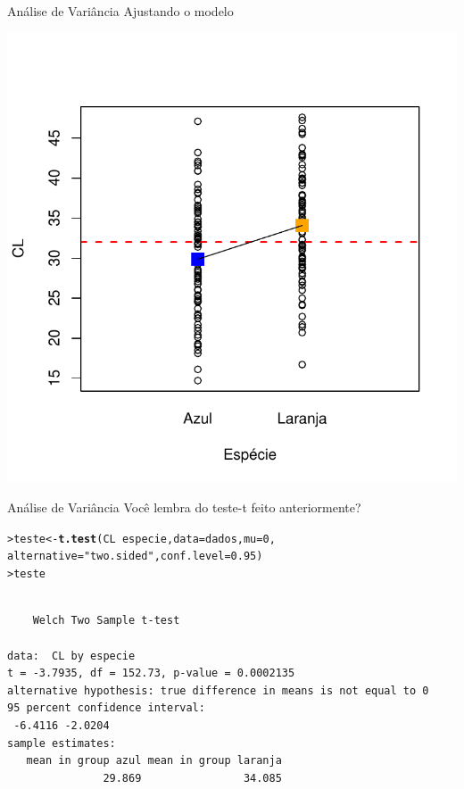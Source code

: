 \documentclass[10pt]{beamer}\usepackage[]{graphicx}\usepackage[]{color}
\makeatletter
\newcommand{\hlnum}[1]{\textcolor[rgb]{0.686,0.059,0.569}{#1}}%
\newcommand{\hlstr}[1]{\textcolor[rgb]{0.282,0.239,0.545}{#1}}%
\newcommand{\hlopt}[1]{\textcolor[rgb]{0,0,0}{#1}}%
\newcommand{\hlstd}[1]{\textcolor[rgb]{0.345,0.345,0.345}{#1}}%
\newcommand{\hlkwb}[1]{\textcolor[rgb]{0.69,0.353,0.396}{#1}}%
\newcommand{\hlkwc}[1]{\textcolor[rgb]{0.333,0.667,0.333}{#1}}%
\newcommand{\hlkwd}[1]{\textcolor[rgb]{0.282,0.239,0.545}{\textbf{#1}}}%
\newenvironment{kframe}{%
 \def\at@end@of@kframe{}%
 \ifinner\ifhmode%
  \def\at@end@of@kframe{\end{minipage}}%
  \begin{minipage}{\columnwidth}%
 \fi\fi%
 \def\FrameCommand##1{\hskip\@totalleftmargin \hskip-\fboxsep
 \colorbox{shadecolor}{##1}\hskip-\fboxsep
     \hskip-\linewidth \hskip-\@totalleftmargin \hskip\columnwidth}%
 \MakeFramed {\advance\hsize-\width
   \@totalleftmargin\z@ \linewidth\hsize
   \@setminipage}}%
 {\par\unskip\endMakeFramed%
 \at@end@of@kframe}
\newenvironment{knitrout}{}{} %
\makeatother
\begin{document}
\begin{frame}[fragile=singleslide]{Análise de Variância}
Ajustando o modelo
\begin{knitrout}\small
{}\color{fgcolor}

{\centering \includegraphics[width=.7\textwidth]{figure/unnamed-chunk-25} 

}



\end{knitrout}

\end{frame}

\begin{frame}[fragile=singleslide]{Análise de Variância}
Você lembra do teste-t feito anteriormente?
\begin{knitrout}\footnotesize
{}\color{fgcolor}\begin{kframe}
\begin{alltt}
\hlstd{> }\hlstd{teste} \hlkwb{<-} \hlkwd{t.test}\hlstd{(CL} \hlopt{~} \hlstd{especie,} \hlkwc{data} \hlstd{= dados,} \hlkwc{mu} \hlstd{=} \hlnum{0}\hlstd{,}
\hlstd{  }                \hlkwc{alternative} \hlstd{=} \hlstr{"two.sided"}\hlstd{,} \hlkwc{conf.level} \hlstd{=} \hlnum{0.95}\hlstd{)}
\hlstd{> }\hlstd{teste}
\end{alltt}
\begin{verbatim}

	Welch Two Sample t-test

data:  CL by especie
t = -3.7935, df = 152.73, p-value = 0.0002135
alternative hypothesis: true difference in means is not equal to 0
95 percent confidence interval:
 -6.4116 -2.0204
sample estimates:
   mean in group azul mean in group laranja 
               29.869                34.085 
\end{verbatim}
\end{kframe}
\end{knitrout}

\end{frame}
\end{document}
